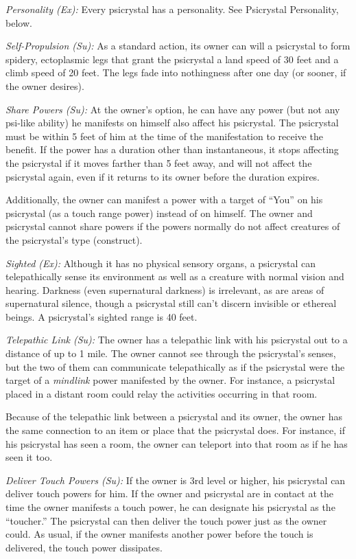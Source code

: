 \documentclass{article}
\begin{document}
\textit{Personality (Ex): }Every psicrystal has a personality. See Psicrystal Personality, 
below.

\textit{Self-Propulsion (Su): }As a standard action, its owner can will a psicrystal 
to form spidery, ectoplasmic legs that grant the psicrystal a land speed of 30 
feet and a climb speed of 20 feet. The legs fade into nothingness after one day 
(or sooner, if the owner desires).

\textit{Share Powers (Su): }At the owner's option, he can have any power (but not 
any psi-like ability) he manifests on himself also affect his psicrystal. The psicrystal 
must be within 5 feet of him at the time of the manifestation to receive the benefit. 
If the power has a duration other than instantaneous, it stops affecting the psicrystal 
if it moves farther than 5 feet away, and will not affect the psicrystal again, 
even if it returns to its owner before the duration expires.

Additionally, the owner can manifest a power with a target of ``You'' on his psicrystal 
(as a touch range power) instead of on himself. The owner and psicrystal cannot 
share powers if the powers normally do not affect creatures of the psicrystal's 
type (construct).

\textit{Sighted (Ex): }Although it has no physical sensory organs, a psicrystal 
can telepathically sense its environment as well as a creature with normal vision 
and hearing. Darkness (even supernatural darkness) is irrelevant, as are areas 
of supernatural silence, though a psicrystal still can't discern invisible or ethereal 
beings. A psicrystal's sighted range is 40 feet.

\textit{Telepathic Link (Su): }The owner has a telepathic link with his psicrystal 
out to a distance of up to 1 mile. The owner cannot see through the psicrystal's 
senses, but the two of them can communicate telepathically as if the psicrystal 
were the target of a \textit{mindlink }power manifested by the owner. For instance, 
a psicrystal placed in a distant room could relay the activities occurring in that 
room.

Because of the telepathic link between a psicrystal and its owner, the owner has 
the same connection to an item or place that the psicrystal does. For instance, 
if his psicrystal has seen a room, the owner can teleport into that room as if 
he has seen it too.

\textit{Deliver Touch Powers (Su): }If the owner is 3rd level or higher, his psicrystal 
can deliver touch powers for him. If the owner and psicrystal are in contact at 
the time the owner manifests a touch power, he can designate his psicrystal as 
the ``toucher.'' The psicrystal can then deliver the touch power just as the owner 
could. As usual, if the owner manifests another power before the touch is delivered, 
the touch power dissipates.
\end{document}
